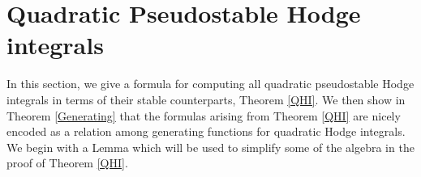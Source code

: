 \documentclass[leqno,12pt]{amsart}
\newtheorem{corollary}[theorem]{Corollary}
\theoremstyle{remark}
\numberwithin{equation}{section}
\DeclareMathOperator{\ps}{ps}
\begin{document}

\section{Quadratic Pseudostable Hodge integrals}\label{sec:quadratic}

In this section, we give a formula for computing all quadratic pseudostable Hodge integrals in terms of their stable counterparts, Theorem \ref{QHI}. We then show in Theorem \ref{Generating} that the formulas  arising from Theorem \ref{QHI} are nicely encoded as a relation among generating functions for quadratic Hodge integrals. 
We begin with a Lemma which will be used to 
simplify some of the algebra in the proof of Theorem \ref{QHI}.
\end{document}
